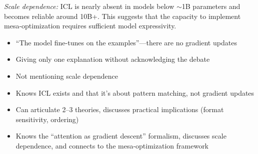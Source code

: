 \begin{interviewq}
\textit{Scale dependence:} ICL is nearly absent in models below $\sim$1B parameters and becomes reliable around 10B+. This suggests that the capacity to implement mesa-optimization requires sufficient model expressivity.

\redflags
\begin{itemize}
    \item ``The model fine-tunes on the examples''---there are no gradient updates
    \item Giving only one explanation without acknowledging the debate
    \item Not mentioning scale dependence
\end{itemize}


\goodgreat
\begin{itemize}
    \item {} Knows ICL exists and that it's about pattern matching, not gradient updates
    \item {} Can articulate 2--3 theories, discusses practical implications (format sensitivity, ordering)
    \item {} Knows the ``attention as gradient descent'' formalism, discusses scale dependence, and connects to the mesa-optimization framework
\end{itemize}

\end{interviewq}

